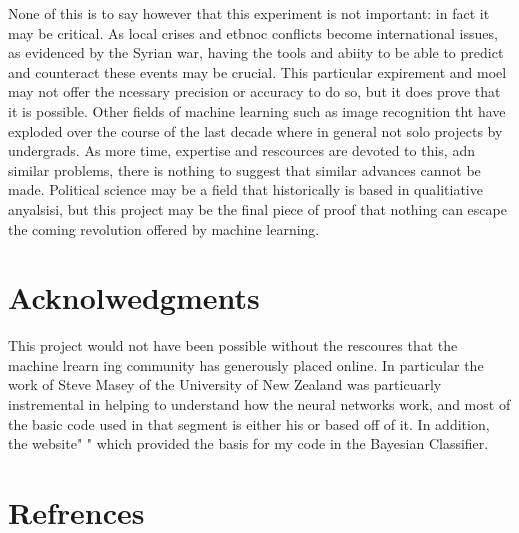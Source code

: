 \documentclass[12pt]{article}
\begin{document}
	None of this is to say however that this experiment is not important: in fact it may be critical. As local crises and etbnoc conflicts become international issues, as evidenced by the Syrian war, having the tools and abiity to be able to predict and counteract these events may be crucial. This particular expirement and moel may not offer the ncessary precision or accuracy to do so, but it does prove that it is possible. Other fields of machine learning such as image recognition tht have exploded over the course of the last decade where in general not solo projects by undergrads. As more time, expertise and rescources are devoted to this, adn similar problems, there is nothing to suggest that similar advances cannot be made. Political science may be a field that historically is based in qualitiative anyalsisi, but this project may be the final piece of proof that nothing can escape the coming revolution offered by machine learning. \\

\section{Acknolwedgments}

This project would not have been possible without the rescoures that the machine lrearn ing community has generously placed online. In particular the work of Steve Masey of the University of New Zealand was particuarly instremental in helping to understand how the neural networks work, and most of the basic code used in that segment is either his or based off of it. In addition, the website{" "} which provided the basis for my code in the Bayesian Classifier.

\section{Refrences}
\printbibliography

\end{document}
